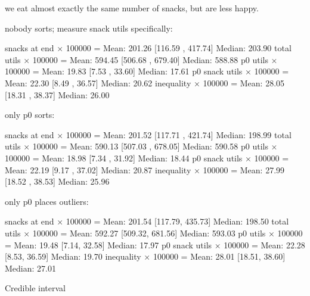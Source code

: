 \documentclass[twocolumn]{article}
\begin{document}
{we eat almost exactly the same number of snacks, but are less happy.


nobody sorts; measure snack utils specifically:

snacks at end × 100000 = Mean: 201.26 [116.59 , 417.74] Median: 203.90
total utils × 100000 = Mean: 594.45 [506.68 , 679.40] Median: 588.88
p0 utils × 100000 = Mean: 19.83 [7.53 , 33.60] Median: 17.61
p0 snack utils × 100000 = Mean: 22.30 [8.49 , 36.57] Median: 20.62
inequality × 100000 = Mean: 28.05 [18.31 , 38.37] Median: 26.00

only p0 sorts:

snacks at end × 100000 = Mean: 201.52 [117.71 , 421.74] Median: 198.99
total utils × 100000 = Mean: 590.13 [507.03 , 678.05] Median: 590.58
p0 utils × 100000 = Mean: 18.98 [7.34 , 31.92] Median: 18.44
p0 snack utils × 100000 = Mean: 22.19 [9.17 , 37.02] Median: 20.87
inequality × 100000 = Mean: 27.99 [18.52 , 38.53] Median: 25.96

only p0 places outliers:

snacks at end × 100000 = Mean: 201.54 [117.79, 435.73] Median: 198.50
total utils × 100000 = Mean: 592.27 [509.32, 681.56] Median: 593.03
p0 utils × 100000 = Mean: 19.48 [7.14, 32.58] Median: 17.97
p0 snack utils × 100000 = Mean: 22.28 [8.53, 36.59] Median: 19.70
inequality × 100000 = Mean: 28.01 [18.51, 38.60] Median: 27.01



Credible interval\cite{kruschke2014doing}
}



\end{document}
